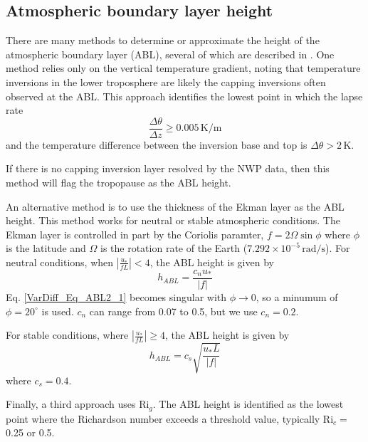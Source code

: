 \subsection{Atmospheric boundary layer height}

There are many methods to determine or approximate the height of the atmospheric boundary
layer (ABL), several of which are described in \cite{Sugiyama1999}. One method relies only on the
vertical temperature gradient, noting that temperature inversions in the lower troposphere
are likely the capping inversions often observed at the ABL. This
approach identifies the lowest point in which the lapse rate
\begin{equation}\label{VarDiff_Eq_ABL1}
\frac{\Delta \theta}{\Delta z} \ge 0.005 \, \mathrm{K} / \mathrm{m}
\end{equation}
and the temperature difference between the inversion base and top
is $\Delta \theta > 2 \, \mathrm{K}$.

If there is no capping inversion layer resolved by the NWP data, then this method
will flag the tropopause as the ABL height.

An alternative method is to use the thickness of the Ekman layer as the ABL height.
This method works for neutral or stable atmospheric conditions. The Ekman layer is
controlled in part by the Coriolis paramter, $f=2 \Omega \sin \phi$ where $\phi$
is the latitude and $\Omega$ is the rotation rate of the Earth
($7.292 \times 10^{-5} \, \mathrm{rad/s}$).  For neutral conditions,
when $\left| \frac{u_*}{f L}\right| < 4$, the ABL height is given by
\begin{equation}\label{VarDiff_Eq_ABL2_1}
h_{ABL} = \frac{c_n u_*}{|f|}
\end{equation}
Eq. \ref{VarDiff_Eq_ABL2_1} becomes singular with $\phi \rightarrow 0$, so a minumum
of $\phi=20^{\circ}$ is used. $c_n$ can range from 0.07 to 0.5, but we use $c_n=0.2$.

For stable conditions, where $\left| \frac{u_*}{f L}\right| \ge 4$, the ABL height is given by
\begin{equation}\label{VarDiff_Eq_ABL2_2}
h_{ABL} = c_s \sqrt{\frac{u_* L}{|f|}}
\end{equation}
where $c_s=0.4$.

Finally, a third approach uses $\mathrm{Ri}_g$. The ABL height is identified as the
lowest point where the Richardson number exceeds a threshold value, typically $\mathrm{Ri}_c=$ 0.25 or
0.5.




